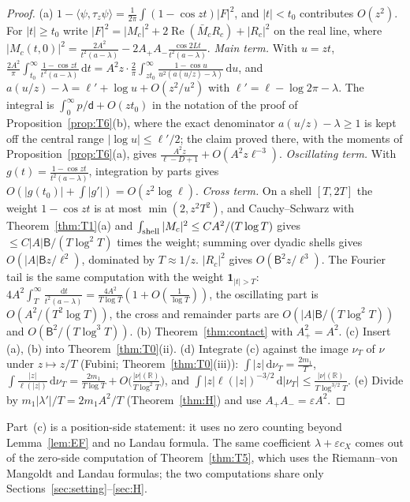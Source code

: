 \documentclass[11pt]{amsart}
\newcommand{\R}{\mathbb{R}}
\newcommand{\one}{\mathbf{1}}
\newcommand{\dd}{\,\mathrm{d}}
\newcommand{\eps}{\varepsilon}
\DeclareMathOperator{\re}{Re}
\theoremstyle{definition}
\theoremstyle{remark}
\numberwithin{equation}{section}
\begin{document}
\begin{proof}
(a) $1-\langle\psi,\tau_z\psi\rangle=\frac1{2\pi}\int(1-\cos zt)|F|^2$, and $|t|<t_0$ contributes $O(z^2)$. For $|t|\ge t_0$ write $|F|^2=|M_c|^2+2\re(\bar M_cR_c)+|R_c|^2$ on the real line, where $|M_c(t,0)|^2=\frac{2A^2}{t^2(a-\lambda)}-2A_+A_-\frac{\cos2Lt}{t^2(a-\lambda)}$. \emph{Main term.} With $u=zt$, $\frac{2A^2}\pi\int_{t_0}^\infty\frac{1-\cos zt}{t^2(a-\lambda)}\dd t=A^2z\cdot\frac2\pi\int_{zt_0}^\infty\frac{1-\cos u}{u^2(a(u/z)-\lambda)}\dd u$, and $a(u/z)-\lambda=\ell'+\log u+O(z^2/u^2)$ with $\ell'=\ell-\log2\pi-\lambda$. The integral is $\int_0^\infty p/\mathsf d+O(zt_0)$ in the notation of the proof of Proposition~\ref{prop:T6}(b), where the exact denominator $a(u/z)-\lambda\ge1$ is kept off the central range $|\log u|\le\ell'/2$; the claim proved there, with the moments of Proposition~\ref{prop:T6}(a), gives $\frac{A^2z}{\ell-D+1}+O(A^2z\ell^{-3})$. \emph{Oscillating term.} With $g(t)=\frac{1-\cos zt}{t^2(a-\lambda)}$, integration by parts gives $O(|g(t_0)|+\int|g'|)=O(z^2\log\ell)$. \emph{Cross term.} On a shell $[T,2T]$ the weight $1-\cos zt$ is at most $\min(2,z^2T^2)$, and Cauchy--Schwarz with Theorem~\ref{thm:T1}(a) and $\int_{\rm shell}|M_c|^2\le CA^2/(T\log T)$ gives $\le C|A|\mathsf B/(T\log^2T)$ times the weight; summing over dyadic shells gives $O(|A|\mathsf Bz/\ell^2)$, dominated by $T\approx1/z$. \emph{$|R_c|^2$} gives $O(\mathsf B^2z/\ell^3)$. The Fourier tail is the same computation with the weight $\one_{|t|>T}$: $4A^2\int_T^\infty\frac{\dd t}{t^2(a-\lambda)}=\frac{4A^2}{T\log T}(1+O(\frac1{\log T}))$, the oscillating part is $O(A^2/(T^2\log T))$, the cross and remainder parts are $O(|A|\mathsf B/(T\log^2T))$ and $O(\mathsf B^2/(T\log^3T))$.
(b) Theorem~\ref{thm:contact} with $A_+^2=A^2$. (c) Insert (a), (b) into Theorem~\ref{thm:T0}(ii). (d) Integrate (c) against the image $\nu_T$ of $\nu$ under $z\mapsto z/T$ (Fubini; Theorem~\ref{thm:T0}(iii)): $\int|z|\dd\nu_T=\frac{2m_1}T$, $\int\frac{|z|}{\ell(|z|)}\dd\nu_T=\frac{2m_1}{T\log T}+O\bigl(\frac{|\nu|(\R)}{T\log^2T}\bigr)$, and $\int|z|\ell(|z|)^{-3/2}\dd|\nu_T|\le\frac{|\nu|(\R)}{T\log^{3/2}T}$. (e) Divide by $m_1|\lambda'|/T=2m_1A^2/T$ (Theorem~\ref{thm:H}) and use $A_+A_-=\eps A^2$.
\end{proof}

Part~(c) is a position-side statement: it uses no zero counting beyond Lemma~\ref{lem:EF} and no Landau formula. The same coefficient $\lambda+\eps c_X$ comes out of the zero-side computation of Theorem~\ref{thm:T5}, which uses the Riemann--von Mangoldt and Landau formulas; the two computations share only Sections~\ref{sec:setting}--\ref{sec:H}.
\end{document}
